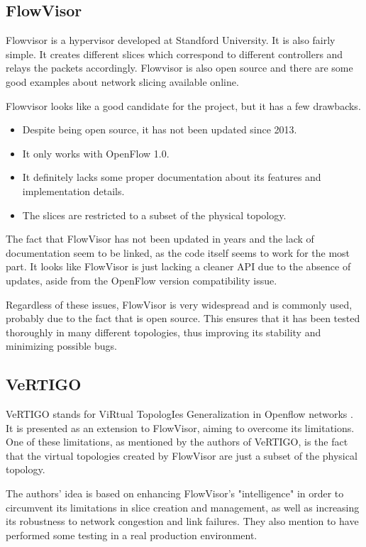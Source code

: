 \subsection{FlowVisor}
Flowvisor is a hypervisor developed at Standford University. It is also fairly simple. It creates different slices which correspond to different controllers and relays the packets accordingly. Flowvisor is also open source and there are some good examples about network slicing available online.

Flowvisor looks like a good candidate for the project, but it has a few drawbacks.
\begin{itemize}
    \item Despite being open source, it has not been updated since 2013.
    \item It only works with OpenFlow 1.0.
    \item It definitely lacks some proper documentation about its features and implementation details.
    \item The slices are restricted to a subset of the physical topology.
\end{itemize}

The fact that FlowVisor has not been updated in years and the lack of documentation seem to be linked, as the code itself seems to work for the most part. It looks like FlowVisor is just lacking a cleaner API due to the absence of updates, aside from the OpenFlow version compatibility issue.

Regardless of these issues, FlowVisor is very widespread and is commonly used, probably due to the fact that is open source. This ensures that it has been tested thoroughly in many different topologies, thus improving its stability and minimizing possible bugs.

\subsection{VeRTIGO}
VeRTIGO stands for ViRtual TopologIes Generalization in Openflow networks \cite{vertigo}. It is presented as an extension to FlowVisor, aiming to overcome its limitations. One of these limitations, as mentioned by the authors of VeRTIGO, is the fact that the virtual topologies created by FlowVisor are just a subset of the physical topology.

The authors' idea is based on enhancing FlowVisor's "intelligence" in order to circumvent its limitations in slice creation and management, as well as increasing its robustness to network congestion and link failures. They also mention to have performed some testing in a real production environment.

